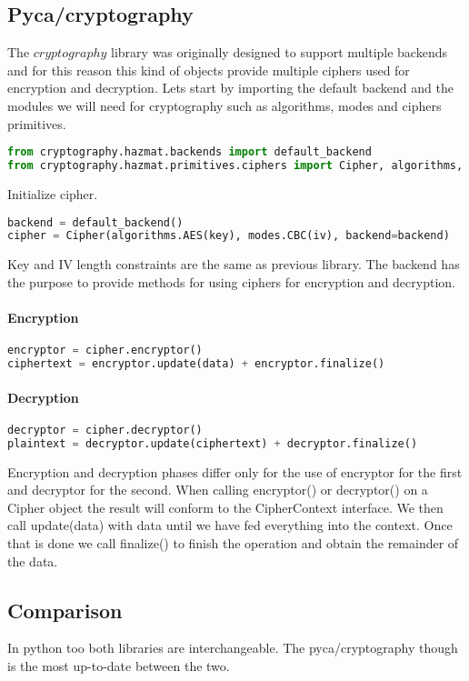 \documentclass[11pt,a4paper]{article}
\begin{document}
\subsection{Pyca/cryptography}
The $cryptography$ library was originally designed to support multiple backends and for this reason this kind of objects provide multiple ciphers used for encryption and decryption. Lets start by importing the default backend and the modules we will need for cryptography such as algorithms, modes and ciphers primitives.
\begin{lstlisting}[language=Python,backgroundcolor = \color{lightgray}]
from cryptography.hazmat.backends import default_backend
from cryptography.hazmat.primitives.ciphers import Cipher, algorithms, modes
\end{lstlisting}
Initialize cipher.
\begin{lstlisting}[language=Python,backgroundcolor = \color{lightgray}]
backend = default_backend()
cipher = Cipher(algorithms.AES(key), modes.CBC(iv), backend=backend)
\end{lstlisting}
Key and IV length constraints are the same as previous library. The backend has the purpose to provide methods for using ciphers for encryption and decryption.
\paragraph{Encryption}
\begin{lstlisting}[language=Python,backgroundcolor = \color{lightgray}]
encryptor = cipher.encryptor()
ciphertext = encryptor.update(data) + encryptor.finalize()
\end{lstlisting}
\paragraph{Decryption}
\begin{lstlisting}[language=Python,backgroundcolor = \color{lightgray}]
decryptor = cipher.decryptor()
plaintext = decryptor.update(ciphertext) + decryptor.finalize()
\end{lstlisting}
Encryption and decryption phases differ only for the use of encryptor for the first and decryptor for the second. When calling encryptor() or decryptor() on a Cipher object the result will conform to the CipherContext interface. We then call update(data) with data until we have fed everything into the context. Once that is done we call finalize() to finish the operation and obtain the remainder of the data.
\subsection{Comparison}
In python too both libraries are interchangeable. The pyca/cryptography though is the most up-to-date between the two.


\end{document}
